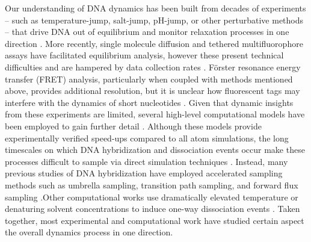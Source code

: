 \documentclass[journal=jpcbfk,manuscript=article]{achemso}
\begin{document}
Our understanding of DNA dynamics has been built from decades of experiments -- such as temperature-jump, salt-jump, pH-jump, or other perturbative methods -- that drive DNA out of equilibrium and monitor relaxation processes in one direction \citep{Morrison1993SensitiveSolution, Wetmur1968KineticsDNA, Craig1971ElaxationOligon, Porschke1973ThermodynamicsPairs, Williams1989LaserDGCATGC, Narayanan2012ExploringMixing, Chen2007InfluenceHybridization, Sanstead2018DirectDehybridization}. More recently, single molecule diffusion and tethered multifluorophore assays have facilitated equilibrium analysis, however these present technical difficulties and are hampered by data collection rates \citep{Liu20173DSolution,  Schickinger2018TetheredHelices, Chen2008Base-by-baseSpectroscopy, Dupuis2013Single-moleculeHelices}. Förster resonance energy transfer (FRET) analysis, particularly when coupled with methods mentioned above, provides additional resolution, but it is unclear how fluorescent tags may interfere with the dynamics of short nucleotides \citep{Morrison1993SensitiveSolution}. Given that dynamic insights from these experiments are limited, several high-level computational models have been employed to gain further detail \citep{Romano2013DNADependence, Hinckley2013AnHybridization, Maciejczyk2014DNAModel, Markegard2015}. Although these models provide experimentally verified speed-ups compared to all atom simulations, the long timescales on which DNA hybridization and dissociation events occur make these processes difficult to sample via direct simulation techniques \citep{Phys2014}. Instead, many previous studies of DNA hybridization have employed accelerated sampling methods such as umbrella sampling,  transition path sampling, and forward flux sampling \citep{Schmitt2013ExploringSurface, Sambriski2009,  Hoefert2011MolecularOligonucleotides, Romano2013DNADependence}.Other computational works use dramatically elevated temperature or denaturing solvent concentrations to induce one-way dissociation events \citep{Wong2008TheSimulations, Perez2010Real-timeUnfolding}. Taken together, most experimental and computational work have studied certain aspect the overall dynamics process in one direction.
\end{document}
